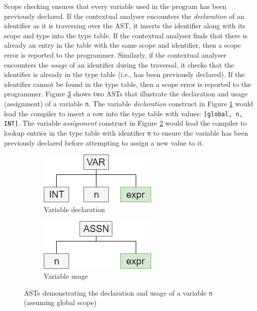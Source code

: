 \documentclass{l4proj}
\begin{document}
Scope checking ensures that every variable used in the program has been previously declared. If the contextual analyser encounters the \textit{declaration} of an identifier as it is traversing over the AST, it inserts the identifier along with its scope and type into the type table. If the contextual analyser finds that there is already an entry in the table with the same scope and identifier, then a scope error is reported to the programmer. Similarly, if the contextual analyser encounters the \textit{usage} of an identifier during the traversal, it checks that the identifier is already in the type table (i.e., has been previously declared). If the identifier cannot be found in the type table, then a scope error is reported to the programmer. Figure \ref{fig:variable-decl-use} shows two ASTs that illustrate the declaration and usage (assignment) of a variable \texttt{n}. The variable \textit{declaration} construct in Figure \ref{fig:variable-decl} would lead the compiler to insert a row into the type table with values: \texttt{[global, n, INT]}. The variable \textit{assignment} construct in Figure \ref{fig:variable-use} would lead the compiler to lookup entries in the type table with identifier \texttt{n} to ensure the variable has been previously declared before attempting to assign a new value to it.

\begin{figure}[h]
	\centering
	\begin{subfigure}[b]{.5\textwidth}
	 	\centering
		\includegraphics[width=.65\linewidth]{images/variable-decl.png}
		\caption{Variable declaration}
		\label{fig:variable-decl}
	\end{subfigure}%
	\begin{subfigure}[b]{.5\textwidth}
	  	\centering
		\includegraphics[width=.65\linewidth]{images/variable-use.png}
		\caption{Variable usage}
		\label{fig:variable-use}
	\end{subfigure}
	\caption{ASTs demonstrating the declaration and usage of a variable \texttt{n} (assuming global scope)}\label{fig:variable-decl-use}	
\end{figure}
\end{document}
